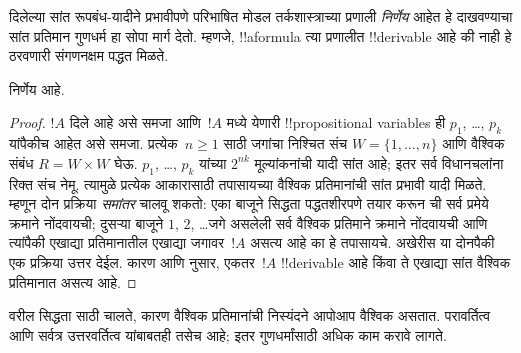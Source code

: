 \documentclass[../../../include/open-logic-section]{subfiles}
\begin{document}

दिलेल्या सांत रूपबंध-यादीने प्रभावीपणे परिभाषित मोडल तर्कशास्त्राच्या
प्रणाली \emph{निर्णेय} आहेत हे दाखवण्याचा
सांत प्रतिमान गुणधर्म हा सोपा मार्ग देतो.
म्हणजे, !!a{formula} त्या प्रणालीत
!!{derivable} आहे की नाही हे ठरवणारी
संगणनक्षम पद्धत मिळते.

\begin{thm}
   निर्णेय आहे.
\end{thm}

\begin{proof}
  $!A$ दिले आहे असे समजा आणि~$!A$ मध्ये येणारी
  !!{propositional variable}s ही $p_1$, \dots, $p_k$
  यांपैकीच आहेत असे समजा. प्रत्येक~$n\geq1$ साठी
  जगांचा निश्चित संच $W=\{1,\ldots,n\}$ आणि वैश्विक संबंध
  $R=W\times W$ घेऊ. $p_1$, \dots, $p_k$ यांच्या $2^{nk}$
  मूल्यांकनांची यादी सांत आहे; इतर सर्व विधानचलांना रिक्त संच नेमू.
  त्यामुळे प्रत्येक आकारासाठी तपासायच्या वैश्विक प्रतिमानांची सांत
  प्रभावी यादी मिळते.
  म्हणून दोन प्रक्रिया \emph{समांतर} चालवू शकतो:
  एका बाजूने सिद्धता पद्धतशीरपणे तयार करून
   ची सर्व प्रमेये क्रमाने नोंदवायची;
  दुसऱ्या बाजूने $1$, $2$, \dots जगे असलेली सर्व
  वैश्विक प्रतिमाने क्रमाने नोंदवायची आणि त्यांपैकी
  एखाद्या प्रतिमानातील एखाद्या जगावर~$!A$ असत्य
  आहे का हे तपासायचे. अखेरीस या दोनपैकी एक
  प्रक्रिया उत्तर देईल. कारण
   आणि
   नुसार, एकतर~$!A$
  !!{derivable} आहे किंवा ते एखाद्या सांत
  वैश्विक प्रतिमानात असत्य आहे.
\end{proof}

वरील सिद्धता  साठी चालते, कारण
वैश्विक प्रतिमानांची निस्यंदने आपोआप वैश्विक
असतात. परावर्तित्व आणि सर्वत्र उत्तरवर्तित्व
यांबाबतही तसेच आहे; इतर गुणधर्मांसाठी अधिक
काम करावे लागते.
\end{document}
